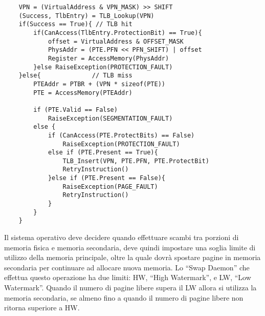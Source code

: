 \documentclass{article}
\numberwithin{equation}{subsection}
\begin{document}
\begin{verbatim}
    VPN = (VirtualAddress & VPN_MASK) >> SHIFT
    (Success, TlbEntry) = TLB_Lookup(VPN)
    if(Success == True){ // TLB hit
        if(CanAccess(TlbEntry.ProtectionBit) == True){
            offset = VirtualAddress & OFFSET_MASK
            PhysAddr = (PTE.PFN << PFN_SHIFT) | offset
            Register = AccessMemory(PhysAddr)
        }else RaiseException(PROTECTION_FAULT)
    }else{              // TLB miss
        PTEAddr = PTBR + (VPN * sizeof(PTE))
        PTE = AccessMemory(PTEAddr)

        if (PTE.Valid == False)
            RaiseException(SEGMENTATION_FAULT)
        else {
            if (CanAccess(PTE.ProtectBits) == False)    
                RaiseException(PROTECTION_FAULT)
            else if (PTE.Present == True){
                TLB_Insert(VPN, PTE.PFN, PTE.ProtectBit)
                RetryInstruction()
            }else if (PTE.Present == False){
                RaiseException(PAGE_FAULT)
                RetryInstruction()
            }
        }
    }   
\end{verbatim}

Il sistema operativo deve decidere quando effettuare scambi tra porzioni di memoria fisica e memoria secondaria, deve quindi impostare una soglia limite di utilizzo 
della memoria principale, oltre la quale dovrà spostare pagine in memoria secondaria per continuare ad allocare nuova memoria. Lo ``Swap Daemon'' che effettua questo 
operazione ha due limiti: HW, ``High Watermark'', e LW, ``Low Watermark''. Quando il numero di pagine libere supera il LW allora si utilizza la memoria secondaria, 
se almeno fino a quando il numero di pagine libere non ritorna superiore a HW. 
\end{document}
